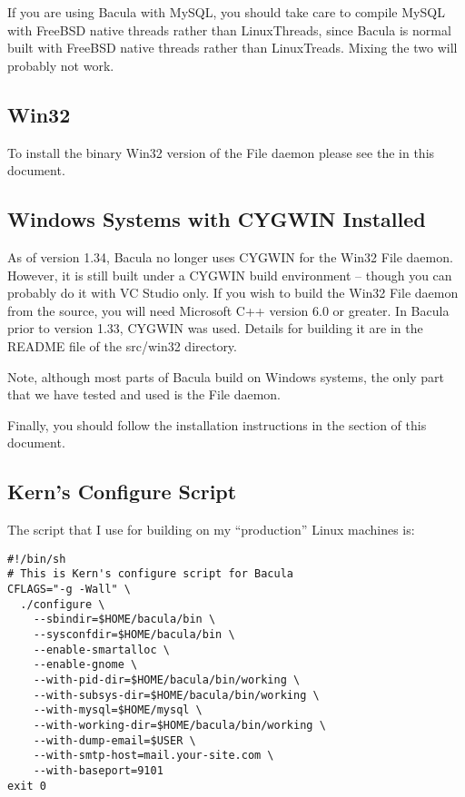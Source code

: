 {{{{{{If you are using Bacula with MySQL, you should take care to compile MySQL with
FreeBSD native threads rather than LinuxThreads, since Bacula is normal built
with FreeBSD native threads rather than LinuxTreads. Mixing the two will
probably not work. 

\subsection*{Win32}

To install the binary Win32 version of the File daemon please see the 
 in this document. 

\subsection*{Windows Systems with CYGWIN Installed}
\label{Win32}

As of version 1.34, Bacula no longer uses CYGWIN for the Win32 File daemon.
However, it is still built under a CYGWIN build environment -- though you can
probably do it with VC Studio only. If you wish to build the Win32 File daemon
from the source, you will need Microsoft C++ version 6.0 or greater. In Bacula
prior to version 1.33, CYGWIN was used. Details for building it are in the
README file of the src/win32 directory. 

Note, although most parts of Bacula build on Windows systems, the only part
that we have tested and used is the File daemon. 

Finally, you should follow the installation instructions in the 
 section of this document. 

\subsection*{Kern's Configure Script}

The script that I use for building on my ``production'' Linux machines is: 

\footnotesize
\begin{verbatim}
#!/bin/sh
# This is Kern's configure script for Bacula
CFLAGS="-g -Wall" \
  ./configure \
    --sbindir=$HOME/bacula/bin \
    --sysconfdir=$HOME/bacula/bin \
    --enable-smartalloc \
    --enable-gnome \
    --with-pid-dir=$HOME/bacula/bin/working \
    --with-subsys-dir=$HOME/bacula/bin/working \
    --with-mysql=$HOME/mysql \
    --with-working-dir=$HOME/bacula/bin/working \
    --with-dump-email=$USER \
    --with-smtp-host=mail.your-site.com \
    --with-baseport=9101
exit 0
\end{verbatim}
\normalsize

}}}}}}
